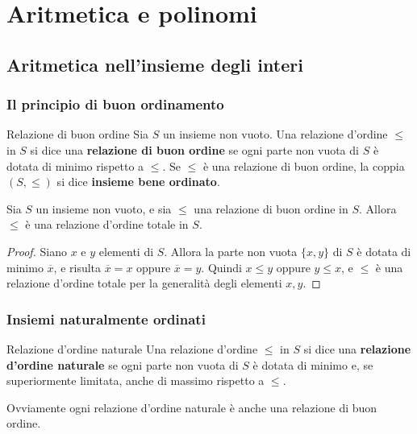\chapter{Aritmetica e polinomi}\label{chapter:aritmetica}

\section{Aritmetica nell'insieme degli interi}

\subsection{Il principio di buon ordinamento}\label{sez:buonordine}

\begin{defbox}{Relazione di buon ordine}
	Sia $S$ un insieme non vuoto. Una relazione d'ordine $\leq$ in $S$ si dice una \textbf{relazione di buon ordine} se ogni parte non vuota di $S$ è dotata di minimo rispetto a $\leq$. Se $\leq$ è una relazione di buon ordine, la coppia $(S,\leq)$ si dice \textbf{insieme bene ordinato}.
\end{defbox}

\begin{lemmabox}
	Sia $S$ un insieme non vuoto, e sia $\leq$ una relazione di buon ordine in $S$. Allora $\leq$ è una relazione d'ordine totale in $S$.
\end{lemmabox}

\begin{proof}
	Siano $x$ e $y$ elementi di $S$. Allora la parte non vuota $\{x,y\}$ di $S$ è dotata di minimo $\overline{x}$, e risulta $\overline{x} = x$ oppure $\overline{x} = y$. Quindi $x \leq y$ oppure $y \leq x$, e $\leq$ è una relazione d'ordine totale per la generalità degli elementi $x,y$.
\end{proof}

\subsection{Insiemi naturalmente ordinati}
\begin{defbox}{Relazione d'ordine naturale}
	Una relazione d'ordine $\leq$ in $S$ si dice una \textbf{relazione d'ordine naturale} se ogni parte non vuota di $S$ è dotata di minimo e, se superiormente limitata, anche di massimo rispetto a $\leq$.
\end{defbox}

\begin{osservation}
	Ovviamente ogni relazione d'ordine naturale è anche una relazione di buon ordine.
\end{osservation}

